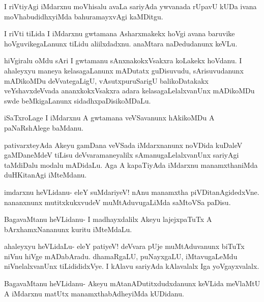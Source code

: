 \documentclass{article}
\begin{document}
\begin{mng}%
I riVtiyAgi iMdarxnu moVhisalu avaLa sariyAda ywvanada
rUpavU kUDa ivana moVhabudidhxyiMda bahuramayxvAgi kaMDitgu.
\end{mng}

\begin{mng}%
I riVti tiLida I iMdarxnu gwtamana Asharxmakekx hoVgi avana
baruvike hoVguvikegaLanunx tiLidu aliilxdadxnu. anaMtara naDedudanunx keVLu.
\end{mng}

\begin{mng}%
hiVgiralu oMdu sAri I gwtamanu sAnxnakokxVsakxra
koLakekx hoVdanu. I ahaleyxyu maneya kelasagaLanunx mADutatx
guDisuvudu, sArisuvudanunx mADikoMDu deVvategaLigU, vAsutxpuruSarigU
balikoDatakakx veYshavxdeVvada ananxkokxVsakxra adara kelasagaLelalxvanUnx
mADikoMDu swde beMkigaLanunx sidadhxpaDisikoMDaLu.
\end{mng}

\begin{mng}%
iSaTxroLage I iMdarxnu A gwtamana veVSavanunx hAkikoMDu
A paNaRshAlege baMdanu.
\end{mng}

\begin{mng}%
pativarxteyAda Akeyu gamDana veVSada iMdarxnanunx noVDida
kuDaleV gaMDaneMdeV tiLisu deVvaramaneyalilx sAmanugaLelalxvanUnx sariyAgi
taMdiDalu modalu mADidaLu. Aga A kapaTiyAda iMdarxnu
manamxthaniMda duHKitanAgi iMteMdanu.
\end{mng}

\begin{mng}%
imdarxnu heVLidanu- eleY suMdariyeV! nAnu manamxtha
piVDitanAgidedxVne. nananxnunx mutitxkukxvudeV muMtAduvugaLiMda saMtoVSa
paDisu.
\end{mng}

\begin{mng}%
BagavaMtanu heVLidanu- I madhayxdalilx Akeyu lajejxpaTuTx
A bArxhamxNananunx kuritu iMteMdaLu.
\end{mng}

\begin{mng}%
ahaleyxyu heVLidaLu- eleY patiyeV! deVvara pUje muMtAduvanunx
biTuTx niVnu hiVge mADabAradu. dhamaRgaLU, puNayxgaLU, iMtavugaLeMdu 
niVnelalxvanUnx tiLidididxVye. I kAlavu sariyAda kAlavalalx
Iga yoVgayxvalalx.
\end{mng}

\begin{mng}%
BagavaMtanu heVLidanu- Akeyu mAtanADutitxdudxdanunx keVLida
meVlaMtU A iMdarxnu matUtx manamxthabAdheyiMda kUDidanu.
\end{mng}
\end{document}
